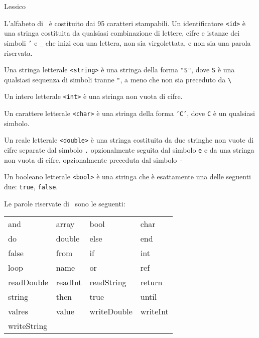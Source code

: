 \begin{section}{Lessico}

	L'alfabeto di \ME \ \`e costituito dai 95 caratteri stampabili. Un
	identificatore \texttt{<id>} \`e una stringa costituita da qualsiasi
	combinazione di lettere, cifre e istanze dei simboli \texttt{'} e
	\texttt{\_} che inizi con una lettera, non sia virgolettata, e non
	sia una parola riservata.

	Una stringa letterale \texttt{<string>} \`e una stringa della forma
	\texttt{"S"}, dove \texttt{S} \`e una qualsiasi sequenza di simboli 
	tranne \texttt{"}, a meno che non sia preceduto da 
	\texttt{\textbackslash}

	Un intero letterale \texttt{<int>} \`e una stringa non vuota di cifre.

	Un carattere letterale \texttt{<char>} \`e una stringa della forma
	\texttt{'C'}, dove \texttt{C} \`e un qualsiasi simbolo.

	Un reale letterale \texttt{<double>} \`e una stringa costituita da
	due stringhe non vuote di cifre separate dal simbolo \texttt{.}
	opzionalmente seguita dal simbolo \texttt{e} e da una stringa non
	vuota di cifre, opzionalmente preceduta dal simbolo \texttt{-}

	Un booleano letterale \texttt{<bool>} \`e una stringa 
	che \`e esattamente una delle
	seguenti due: \texttt{true}, \texttt{false}.

	Le parole riservate di \ME \ sono le seguenti:

	\begin{center} \begin{tabular} {llll}
		and & array & bool & char \\
		do & double & else & end \\
		false & from & if & int \\
		loop & name & or & ref \\
		readDouble & readInt & readString & return \\
		string & then & true & until \\ 
		valres & value & writeDouble & writeInt \\
		writeString \\
	
	\end{tabular} \end{center}

\end{section}

